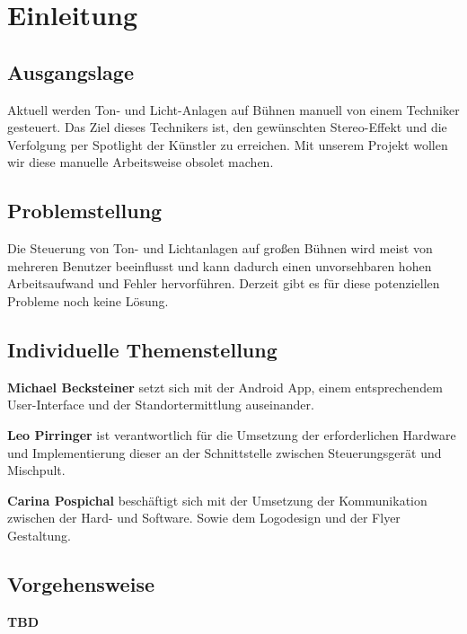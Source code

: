 \chapter{Einleitung}
\section{Ausgangslage}
Aktuell werden Ton- und Licht-Anlagen auf Bühnen manuell von einem Techniker gesteuert. Das Ziel dieses Technikers ist, den gewünschten Stereo-Effekt  und die Verfolgung per Spotlight der Künstler zu erreichen. Mit unserem Projekt wollen wir diese manuelle Arbeitsweise obsolet machen.

\section{Problemstellung}
Die Steuerung von Ton- und Lichtanlagen auf großen Bühnen wird meist von mehreren Benutzer beeinflusst und kann dadurch einen unvorsehbaren hohen Arbeitsaufwand und Fehler hervorführen. Derzeit gibt es für diese potenziellen Probleme noch keine Lösung.

\section{Individuelle Themenstellung}
\textbf{Michael Becksteiner} setzt sich mit der Android App, einem entsprechendem User-Interface und der Standortermittlung auseinander. 

\textbf{Leo Pirringer} ist verantwortlich für die Umsetzung der erforderlichen Hardware und Implementierung dieser an der Schnittstelle zwischen Steuerungsgerät und Mischpult. 

\textbf{Carina Pospichal} beschäftigt sich mit der Umsetzung der Kommunikation zwischen der Hard- und Software. Sowie dem Logodesign und der Flyer Gestaltung. 

\section{Vorgehensweise} 
\textbf{TBD}